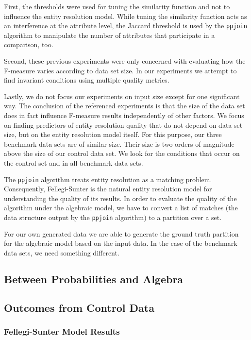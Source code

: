 First, the thresholds were used for tuning the similarity function and not to
influence the entity resolution model.
While tuning the similarity function acts as an interference at the attribute
level, the Jaccard threshold is used by the \texttt{ppjoin} algorithm
to manipulate the number of attributes that participate in a comparison, too.

Second, these previous experiments were only concerned with evaluating how the
F-measure varies according to data set size.
In our experiments we attempt to find invariant conditions using multiple
quality metrics.
 
Lastly, we do not focus our experiments on input size except for one significant
way.
The conclusion of the referenced experiments is that the size of the data set
does in fact influence F-measure results independently of other factors.
We focus on finding predictors of entity resolution quality that do not depend
on data set size, but on the entity resolution model itself.
For this purpose, our three benchmark data sets are of similar size.
Their size is two orders of magnitude above the size of our control data set.
We look for the conditions that occur on the control set and in all benchmark
data sets.

The \texttt{ppjoin} algorithm treats entity resolution as a matching problem.
Consequently, Fellegi-Sunter is the natural entity resolution model for
understanding the quality of its results.
In order to evaluate the quality of the algorithm under the algebraic model, we
have to convert a list of matches (the data structure output by the \texttt{ppjoin}
algorithm) to a partition over a set.

For our own generated data we are able to generate the ground truth partition
for the algebraic model based on the input data.
In the case of the benchmark data sets, we need something different.

\subsection{Between Probabilities and Algebra}\label{subsec:Probabilities to Algebra}


\subsection{Outcomes from Control Data}\label{subsec:Control Data}

\subsubsection{Fellegi-Sunter Model Results}\label{subsubsec:F-S Results}


